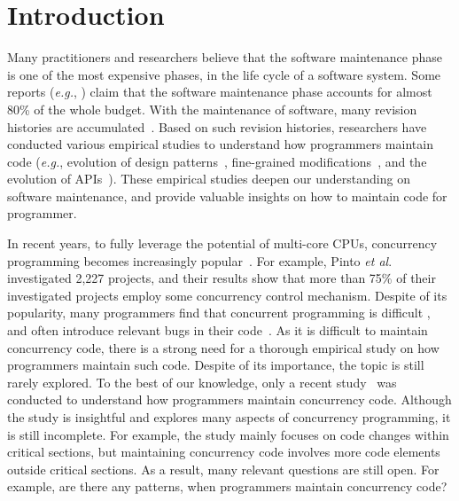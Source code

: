 \section{Introduction}
Many practitioners and researchers believe that the software maintenance phase is one of the most expensive phases, in the life cycle of a software system. Some reports (\emph{e.g.}, \cite{ahn2003software}) claim that the software maintenance phase accounts for almost 80\% of the whole budget. With the maintenance of software, many revision histories are accumulated~\cite{conf/icsm/Borges16}. Based on such revision histories, researchers have conducted various empirical studies to understand how programmers maintain code (\emph{e.g.}, evolution of design patterns~\cite{aversano2007empirical}, fine-grained modifications~\cite{german2006empirical}, and the evolution of APIs~\cite{mcdonnell2013empirical}). These empirical studies deepen our understanding on software maintenance, and provide valuable insights on how to maintain code for programmer. 



In recent years, to fully leverage the potential of multi-core CPUs, concurrency programming becomes increasingly popular~\cite{journals/jss/PintoTFFB15}. For example, Pinto \textit{et al}. \cite{journals/jss/PintoTFFB15} investigated 2,227 projects, and their results show that more than 75\% of their investigated projects employ some concurrency control mechanism. Despite of its popularity, many programmers find that concurrent programming is difficult \cite{journals/corr/McKenney17}, and often introduce relevant bugs in their code~\cite{conf/asplos/LuPSZ08}. As it is difficult to maintain concurrency code, there is a strong need for a thorough empirical study on how programmers maintain such code. Despite of its importance, the topic is still rarely explored. To the best of our knowledge, only a recent study~\cite{conf/sigsoft/GuJSZL15} was conducted to understand how programmers maintain concurrency code. Although the study is insightful and explores many aspects of concurrency programming, it is still incomplete. For example, the study mainly focuses on code changes within critical sections, but maintaining concurrency code involves more code elements outside critical sections. As a result, many relevant questions are still open. For example, are there any patterns, when programmers maintain concurrency code?



